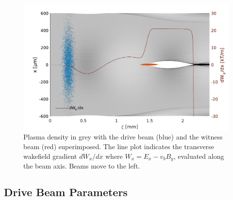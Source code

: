\documentclass[aps,prstab,reprint,amsmath,amssymb,groupedaddress,onecolumn]{revtex4-1}
\begin{document}

\begin{figure}[hbt]
    \includegraphics[width=\linewidth,trim={2mm 0mm 2mm 0mm},clip]{figures/plasmaDenTWake}
    \caption{\label{Fig:PlasmaDenTWake} %
    Plasma density in grey with the drive beam (blue) and the witness beam (red)
        superimposed. The line plot indicates the transverse wakefield gradient $dW_{x}/dx$ where
        $W_{x} = E_{x} - v_{b} B_{y}$, evaluated along the beam axis.
        Beams move to the left.}
\end{figure}

\subsection{Drive Beam Parameters}\label{S:M:Setup}
\end{document}
